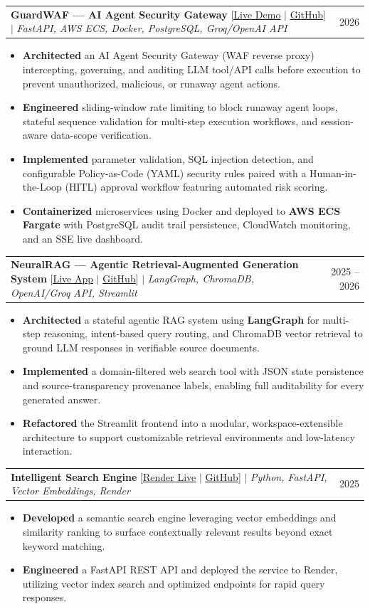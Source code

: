 \documentclass[letterpaper,10.5pt]{article}
\makeatletter
\newcommand{\resumeItem}[1]{
  \item\small{
    {#1 \vspace{-2pt}}
  }
}
\newcommand{\resumeProjectHeading}[2]{
    \item
    \begin{tabular*}{0.97\textwidth}{l@{\extracolsep{\fill}}r}
      \small#1 & #2 \\
    \end{tabular*}\vspace{-7pt}
}
\newcommand{\resumeItemListStart}{\begin{itemize}[leftmargin=0.15in]}
\newcommand{\resumeItemListEnd}{\end{itemize}\vspace{-5pt}}
\makeatother
\begin{document}
\begin{center}
      \resumeProjectHeading
          {\textbf{GuardWAF — AI Agent Security Gateway} [\href{http://43.205.239.119:8000/static/index.html}{\underline{Live Demo}} $|$ \href{https://github.com/Aadhidharmar001}{\underline{GitHub}}] $|$ \emph{FastAPI, AWS ECS, Docker, PostgreSQL, Groq/OpenAI API}}{2026}
          \resumeItemListStart
            \resumeItem{\textbf{Architected} an AI Agent Security Gateway (WAF reverse proxy) intercepting, governing, and auditing LLM tool/API calls before execution to prevent unauthorized, malicious, or runaway agent actions.}
            \resumeItem{\textbf{Engineered} sliding-window rate limiting to block runaway agent loops, stateful sequence validation for multi-step execution workflows, and session-aware data-scope verification.}
            \resumeItem{\textbf{Implemented} parameter validation, SQL injection detection, and configurable Policy-as-Code (YAML) security rules paired with a Human-in-the-Loop (HITL) approval workflow featuring automated risk scoring.}
            \resumeItem{\textbf{Containerized} microservices using Docker and deployed to \textbf{AWS ECS Fargate} with PostgreSQL audit trail persistence, CloudWatch monitoring, and an SSE live dashboard.}
          \resumeItemListEnd

      \resumeProjectHeading
          {\textbf{NeuralRAG — Agentic Retrieval-Augmented Generation System} [\href{https://neuralrag.streamlit.app/}{\underline{Live App}} $|$ \href{https://github.com/Aadhidharmar001}{\underline{GitHub}}] $|$ \emph{LangGraph, ChromaDB, OpenAI/Groq API, Streamlit}}{2025 -- 2026}
          \resumeItemListStart
            \resumeItem{\textbf{Architected} a stateful agentic RAG system using \textbf{LangGraph} for multi-step reasoning, intent-based query routing, and ChromaDB vector retrieval to ground LLM responses in verifiable source documents.}
            \resumeItem{\textbf{Implemented} a domain-filtered web search tool with JSON state persistence and source-transparency provenance labels, enabling full auditability for every generated answer.}
            \resumeItem{\textbf{Refactored} the Streamlit frontend into a modular, workspace-extensible architecture to support customizable retrieval environments and low-latency interaction.}
          \resumeItemListEnd

      \resumeProjectHeading
          {\textbf{Intelligent Search Engine} [\href{https://github.com/Aadhidharmar001}{\underline{Render Live}} $|$ \href{https://github.com/Aadhidharmar001}{\underline{GitHub}}] $|$ \emph{Python, FastAPI, Vector Embeddings, Render}}{2025}
          \resumeItemListStart
            \resumeItem{\textbf{Developed} a semantic search engine leveraging vector embeddings and similarity ranking to surface contextually relevant results beyond exact keyword matching.}
            \resumeItem{\textbf{Engineered} a FastAPI REST API and deployed the service to Render, utilizing vector index search and optimized endpoints for rapid query responses.}
          \resumeItemListEnd


\end{center}
\end{document}
